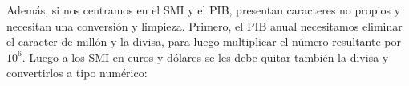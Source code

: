 \documentclass[
]{article}
\newenvironment{Shaded}{\begin{snugshade}}{\end{snugshade}}
\newcommand{\CommentTok}[1]{\textcolor[rgb]{0.56,0.35,0.01}{\textit{#1}}}
\newcommand{\FunctionTok}[1]{\textcolor[rgb]{0.13,0.29,0.53}{\textbf{#1}}}
\newcommand{\NormalTok}[1]{#1}
\newcommand{\OtherTok}[1]{\textcolor[rgb]{0.56,0.35,0.01}{#1}}
\newcommand{\SpecialCharTok}[1]{\textcolor[rgb]{0.81,0.36,0.00}{\textbf{#1}}}
\newcommand{\StringTok}[1]{\textcolor[rgb]{0.31,0.60,0.02}{#1}}
\begin{document}
\begin{Shaded}
\end{Shaded}

Además, si nos centramos en el SMI y el PIB, presentan caracteres no
propios y necesitan una conversión y limpieza. Primero, el PIB anual
necesitamos eliminar el caracter de millón y la divisa, para luego
multiplicar el número resultante por \(10^{6}\). Luego a los SMI en
euros y dólares se les debe quitar también la divisa y convertirlos a
tipo numérico:
\end{document}
